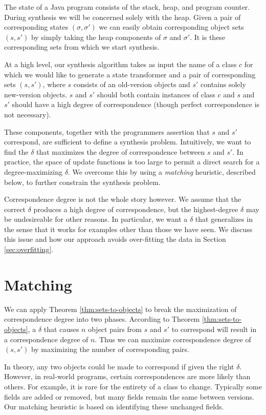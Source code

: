 The state of a Java program consists of the stack, heap, and program
counter.  During synthesis we will be concerned solely with the heap.
Given a pair of corresponding states $(\sigma,\sigma')$ we can easily
obtain corresponding object sets $(s,s')$ by simply taking the heap
components of $\sigma$ and $\sigma'$.  It is these corresponding sets
from which we start synthesis.

At a high level, our synthesis algorithm takes as input the name of a
class $c$ for which we would like to generate a state transformer and
a pair of corresponding sets $(s,s')$, where $s$ consists of an
old-version objects and $s'$ contains solely new-version objects.  $s$
and $s'$ should both contain instances of class $c$ and $s$ and $s'$
should have a high degree of correspondence (though perfect
correspondence is not necessary).

These components, together with the programmers assertion that $s$ and
$s'$ correspond, are sufficient to define a synthesis problem.
Intuitively, we want to find the $\delta$ that maximizes the degree of
correspondence between $s$ and $s'$.  In practice, the space of update
functions is too large to permit a direct search for a
degree-maximizing $\delta$.  We overcome this by using a
\emph{matching} heuristic, described below, to further constrain the
synthesis problem.

Correspondence degree is not the whole story however.  We assume that
the correct $\delta$ produces a high degree of correspondence, but the
highest-degree $\delta$ may be undesireable for other reasons.  In
particular, we want a $\delta$ that generalizes in the sense that it
works for examples other than those we have seen.  We discuss this
issue and how our approach avoids over-fitting the data in Section
\ref{sec:overfitting}.


\section{Matching}
\label{sec:matching}

We can apply Theorem \ref{thm:sets-to-objects} to break the
maximization of correspondence degree into two phases.  According to
Theorem \ref{thm:sets-to-objects}, a $\delta$ that causes $n$ object
pairs from $s$ and $s'$ to correspond will result in a correspondence
degree of $n$.  Thus we can maximize correspondence degree of $(s,s')$
by maximizing the number of corresponding pairs.

In theory, any two objects could be made to correspond if given the
right $\delta$.  However, in real-world programs, certain
correspondences are more likely than others.  For example, it is rare
for the entirety of a class to change.  Typically some fields are
added or removed, but many fields remain the same between versions.
Our matching heuristic is based on identifying these unchanged fields.


